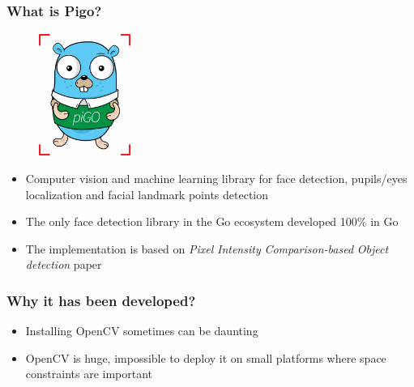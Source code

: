 \documentclass[9pt]{beamer}
\begin{document}
\begin{frame}[fragile]
\frametitle{What is Pigo?}


\begin{figure}[h]
\begin{center}
\includegraphics[width=3cm,height=4cm]{assets/pigo_logo.png}
\end{center}

\end{figure}

\begin{itemize}
\item Computer vision and machine learning library for face detection, pupils/eyes localization and facial landmark points detection
\item The only face detection library in the Go ecosystem developed 100\% in Go
\item The implementation is based on \emph{Pixel} \emph{Intensity} \emph{Comparison-based} \emph{Object} \emph{detection} paper
\end{itemize}


\end{frame}

\begin{frame}[fragile]
\frametitle{Why it has been developed?}


\begin{itemize}
\item Installing OpenCV sometimes can be daunting
\item OpenCV is huge, impossible to deploy it on small platforms where space constraints are important
\end{itemize}


\end{frame}
\end{document}
